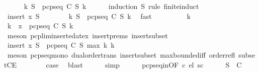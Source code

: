 \begin{isabellebody}
\ \ \ \ \isamarkupfalse%
\ {\isachardoublequoteopen}{\isasymexists}k{\isachardot}\ S{\isacharprime}\ {\isasymsubseteq}\ pcp{\isacharunderscore}seq\ C\ S\ k{\isachardoublequoteclose}\ \isanewline
\ \ \ \ \isamarkupfalse%
{\isacharparenleft}induction\ S{\isacharprime}\ rule{\isacharcolon}\ finite{\isacharunderscore}induct{\isacharparenright}\ \isanewline
\ \ \ \ \ \ \isamarkupfalse%
\ {\isacharparenleft}insert\ x\ S{\isacharprime}{\isacharparenright}\isanewline
\ \ \ \ \ \ \isamarkupfalse%
\ {\isachardoublequoteopen}{\isasymexists}k{\isachardot}\ S{\isacharprime}\ {\isasymsubseteq}\ pcp{\isacharunderscore}seq\ C\ S\ k{\isachardoublequoteclose}\ \isamarkupfalse%
\ fast\isanewline
\ \ \ \ \ \ \isamarkupfalse%
\ \isamarkupfalse%
\ k{}\ \isacommand{{\isachardot}{\isachardot}}\isamarkupfalse%
\isanewline
\ \ \ \ \ \ \isamarkupfalse%
\ \isamarkupfalse%
\ k{}\ \ {\isachardoublequoteopen}x\ {\isasymin}\ pcp{\isacharunderscore}seq\ C\ S\ k{}{\isachardoublequoteclose}\isanewline
\ \ \ \ \ \ \ \ \isamarkupfalse%
\ {\isacharparenleft}meson\ pcp{\isacharunderscore}lim{\isacharunderscore}inserted{\isacharunderscore}at{\isacharunderscore}ex\ insert{\isachardot}prems\ insert{\isacharunderscore}subset{\isacharparenright}\isanewline
\ \ \ \ \ \ \isamarkupfalse%
\ \isamarkupfalse%
\ {\isachardoublequoteopen}insert\ x\ S{\isacharprime}\ {\isasymsubseteq}\ pcp{\isacharunderscore}seq\ C\ S\ {\isacharparenleft}max\ k{}\ k{}{\isacharparenright}{\isachardoublequoteclose}\isanewline
\ \ \ \ \ \ \ \ \isamarkupfalse%
\ {\isacharparenleft}meson\ pcp{\isacharunderscore}seq{\isacharunderscore}mono\ dual{\isacharunderscore}order{\isachardot}trans\ insert{\isacharunderscore}subset\ max{\isachardot}bounded{\isacharunderscore}iff\ order{\isacharunderscore}refl\ subsetCE{\isacharparenright}\isanewline
\ \ \ \ \ \ \isamarkupfalse%
\ {\isacharquery}case\ \isamarkupfalse%
\ blast\isanewline
\ \ \ \ \isamarkupfalse%
\ simp\isanewline
\ \ \ \ \isamarkupfalse%
\ pcp{\isacharunderscore}seq{\isacharunderscore}in{\isacharbrackleft}OF\ c\ el{\isacharbrackright}\ sc\isanewline
\ \ \ \ \isamarkupfalse%
\ {\isachardoublequoteopen}S{\isacharprime}\ {\isasymin}\ C{\isachardoublequoteclose}\ \isamarkupfalse%

\end{isabellebody}
